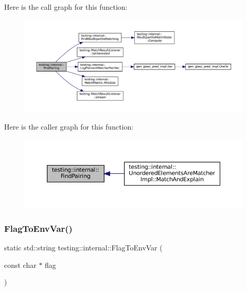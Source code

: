 Here is the call graph for this function\+:
\nopagebreak
\begin{figure}[H]
\begin{center}
\leavevmode
\includegraphics[width=350pt]{namespacetesting_1_1internal_af2bd2e350b56422a3d9d3b986ac1df0e_cgraph}
\end{center}
\end{figure}
Here is the caller graph for this function\+:
\nopagebreak
\begin{figure}[H]
\begin{center}
\leavevmode
\includegraphics[width=350pt]{namespacetesting_1_1internal_af2bd2e350b56422a3d9d3b986ac1df0e_icgraph}
\end{center}
\end{figure}
\mbox{\label{namespacetesting_1_1internal_a7540386ecf74d7ab7e2fa6089db94682}} 
\subsubsection{\texorpdfstring{Flag\+To\+Env\+Var()}{FlagToEnvVar()}}
{\footnotesize\ttfamily static std\+::string testing\+::internal\+::\+Flag\+To\+Env\+Var (\begin{DoxyParamCaption}\item[{const char $\ast$}]{flag }\end{DoxyParamCaption})\hspace{0.3cm}{\ttfamily [static]}}



